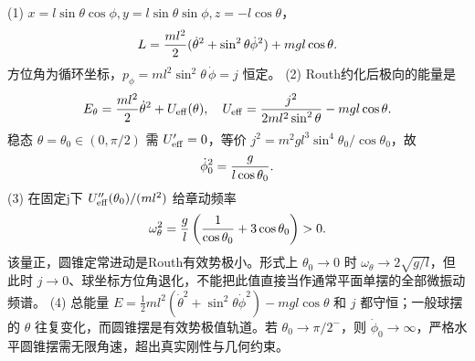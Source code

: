 (1) \(x=l\sin\theta\cos\phi,y=l\sin\theta\sin\phi,z=-l\cos\theta\)，
\[
L={ml^2\over2}(\dot\theta^2+\sin^2\theta\dot\phi^2)+mgl\cos\theta.
\]
方位角为循环坐标，\(p_\phi=ml^2\sin^2\theta\,\dot\phi=j\) 恒定。
(2) Routh约化后极向的能量是
\[
E_\theta={ml^2\over2}\dot\theta^2+U_{\rm eff}(\theta),\quad
U_{\rm eff}={j^2\over2ml^2\sin^2\theta}-mgl\cos\theta .
\]
稳态 \(\theta=\theta_0\in(0,\pi/2)\) 需 \(U'_{\rm eff}=0\)，等价
\(j^2=m^2gl^3\sin^4\theta_0/\cos\theta_0\)，故
\[
\dot\phi_0^2={g\over l\cos\theta_0}.
\]
(3) 在固定j下 \(U''_{\rm eff}(\theta_0)/(ml^2)\) 给章动频率
\[
\omega_{\theta}^2={g\over l}\left({1\over\cos\theta_0}+3\cos\theta_0\right)>0.
\]
该量正，圆锥定常进动是Routh有效势极小。形式上 \(\theta_0\to0\) 时 \(\omega_\theta\to2\sqrt{g/l}\)，但此时 \(j\to0\)、球坐标方位角退化，不能把此值直接当作通常平面单摆的全部微振动频谱。
(4) 总能量 \(E=\frac12ml^2(\dot\theta^2+\sin^2\theta\dot\phi^2)-mgl\cos\theta\) 和 \(j\) 都守恒；一般球摆的 \(\theta\) 往复变化，而圆锥摆是有效势极值轨道。若 \(\theta_0\to\pi/2^-\)，则 \(\dot\phi_0\to\infty\)，严格水平圆锥摆需无限角速，超出真实刚性与几何约束。
